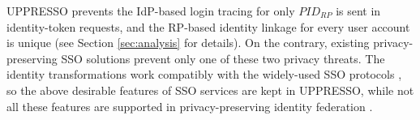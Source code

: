 UPPRESSO prevents the IdP-based login tracing for only $PID_{RP}$ is sent in identity-token requests,
    and the RP-based identity linkage for every user account is unique
    (see Section \ref{sec:analysis} for details).
On the contrary,
     existing privacy-preserving SSO solutions \cite{BrowserID,SPRESSO,NIST2017draft,FirefoxAccount} prevent only one of these two privacy threats.
The identity transformations work compatibly with
    the widely-used SSO protocols \cite{OpenIDConnect,rfc6749,SAML,NIST2017draft},
    so the above desirable features of SSO services are kept in UPPRESSO,
    while not all these features are supported in privacy-preserving identity federation \cite{PseudoID,ELPASSO,UnlimitID,Opaak,uprov,hyperledge-idemix}.
%
%
